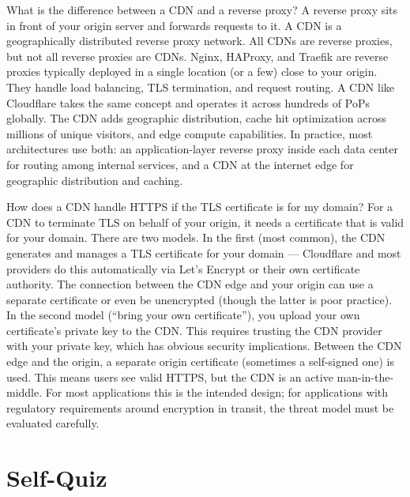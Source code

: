 \documentclass[11pt,a4paper]{article}
\begin{document}
\begin{curiobox}{What is the difference between a CDN and a reverse proxy?}
A reverse proxy sits in front of your origin server and forwards requests to it. A CDN is a geographically distributed reverse proxy network. All CDNs are reverse proxies, but not all reverse proxies are CDNs. Nginx, HAProxy, and Traefik are reverse proxies typically deployed in a single location (or a few) close to your origin. They handle load balancing, TLS termination, and request routing. A CDN like Cloudflare takes the same concept and operates it across hundreds of PoPs globally. The CDN adds geographic distribution, cache hit optimization across millions of unique visitors, and edge compute capabilities. In practice, most architectures use both: an application-layer reverse proxy inside each data center for routing among internal services, and a CDN at the internet edge for geographic distribution and caching.
\end{curiobox}

\begin{curiobox}{How does a CDN handle HTTPS if the TLS certificate is for my domain?}
For a CDN to terminate TLS on behalf of your origin, it needs a certificate that is valid for your domain. There are two models. In the first (most common), the CDN generates and manages a TLS certificate for your domain --- Cloudflare and most providers do this automatically via Let's Encrypt or their own certificate authority. The connection between the CDN edge and your origin can use a separate certificate or even be unencrypted (though the latter is poor practice). In the second model (``bring your own certificate''), you upload your own certificate's private key to the CDN. This requires trusting the CDN provider with your private key, which has obvious security implications. Between the CDN edge and the origin, a separate origin certificate (sometimes a self-signed one) is used. This means users see valid HTTPS, but the CDN is an active man-in-the-middle. For most applications this is the intended design; for applications with regulatory requirements around encryption in transit, the threat model must be evaluated carefully.
\end{curiobox}

\section{Self-Quiz}
\end{document}
